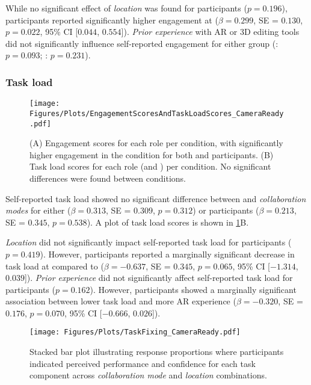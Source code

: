 While no significant effect of \textit{location} was found for \exsitu participants ($p = 0.196$), \insitu participants reported significantly higher engagement at \locB ($\beta = 0.299$, SE = $0.130$, $p = 0.022$, 95\% CI [$0.044$, $0.554$]). \textit{Prior experience} with AR or 3D editing tools did not significantly influence self-reported engagement for either group (\exsitu: $p = 0.093$; \insitu: $p = 0.231$).

\subsubsection{Task load}
\begin{figure}
    \centering
    \texttt{[image: Figures/Plots/EngagementScoresAndTaskLoadScores\_CameraReady.pdf]}
    \caption{\textsf{(A)} Engagement scores for each role per condition, with significantly higher engagement in the \sync condition for both \insitu and \exsitu participants. \textsf{(B)} Task load scores for each role (\exsitu and \insitu) per condition. No significant differences were found between conditions.}
    \label{fig:engagement-task_load-plot}
\end{figure}

Self-reported task load showed no significant difference between \sync and \async \textit{collaboration modes} for either \exsitu ($\beta = 0.313$, SE = $0.309$, $p = 0.312$) or \insitu participants ($\beta = 0.213$, SE = $0.345$, $p = 0.538$). A plot of task load scores is shown in \cref{fig:engagement-task_load-plot}B.

\textit{Location} did not significantly impact self-reported task load for \exsitu participants ($p = 0.419$). However, \insitu participants reported a marginally significant decrease in task load at \locB compared to \locA ($\beta = -0.637$, SE = $0.345$, $p = 0.065$, 95\% CI [$-1.314$, $0.039$]). \textit{Prior experience} did not significantly affect self-reported task load for \exsitu participants ($p = 0.162$). However, \insitu participants showed a marginally significant association between lower task load and more AR experience ($\beta = -0.320$, SE = $0.176$, $p = 0.070$, 95\% CI [$-0.666$, $0.026$]).


\begin{figure}
    \centering
    \texttt{[image: Figures/Plots/TaskFixing\_CameraReady.pdf]}
    \caption{Stacked bar plot illustrating response proportions where participants indicated perceived performance and confidence for each task component across \textit{collaboration mode} and \textit{location} combinations.}
    \label{fig:confidence-task-plot}
\end{figure}

